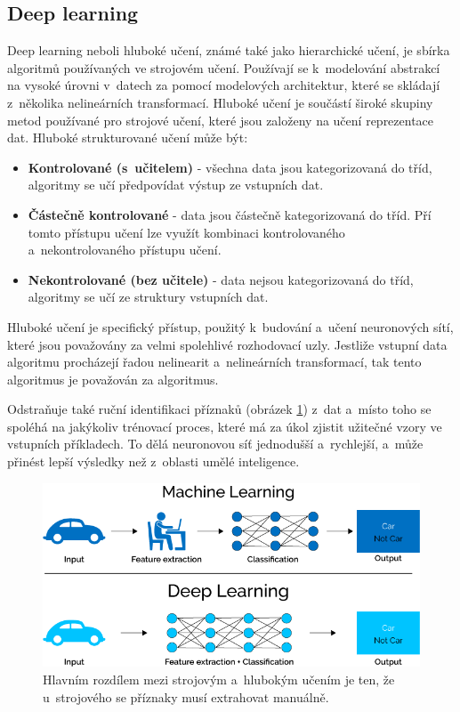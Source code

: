 \subsection{Deep learning}
Deep learning neboli hluboké učení, známé také jako hierarchické učení, je sbírka algoritmů používaných ve strojovém učení. Používají se k~modelování abstrakcí na vysoké úrovni v~datech za pomocí modelových architektur, které se skládají z~několika nelineárních transformací. Hluboké učení je součástí široké skupiny metod používané pro strojové učení, které jsou založeny na učení reprezentace dat. Hluboké strukturované učení může být:
\begin{itemize}
  \item{\textbf{Kontrolované (s~učitelem)} - všechna data jsou kategorizovaná do tříd, algoritmy se učí předpovídat výstup ze vstupních dat.}
  \item{\textbf{Částečně kontrolované} - data jsou částečně kategorizovaná do tříd. Pří tomto přístupu učení lze využít kombinaci kontrolovaného a~nekontrolovaného přístupu učení.}
  \item{\textbf{Nekontrolované (bez učitele)} - data nejsou kategorizovaná do tříd, algoritmy se učí ze struktury vstupních dat.}
\end{itemize}
Hluboké učení je specifický přístup, použitý k~budování a~učení neuronových sítí, které jsou považovány za velmi spolehlivé rozhodovací uzly. Jestliže vstupní data algoritmu procházejí řadou nelinearit a~nelineárních transformací, tak tento algoritmus je považován za  algoritmus. 

Odstraňuje také ruční identifikaci příznaků (obrázek \ref{fig:ml_vs_ann}) z~dat a~místo toho se spoléhá na jakýkoliv trénovací proces, které má za úkol zjistit užitečné vzory ve vstupních příkladech. To dělá neuronovou síť jednodušší a~rychlejší, a~může přinést lepší výsledky než z~oblasti umělé inteligence.

\begin{figure}[H]
\centering
\includegraphics[width=.85\linewidth]{figures/ml_vs_ann}
\caption{Hlavním rozdílem mezi strojovým a~hlubokým učením je ten, že u~strojového se příznaky musí extrahovat manuálně. \cite{fig:mlvsann}}
\label{fig:ml_vs_ann}
\end{figure}

